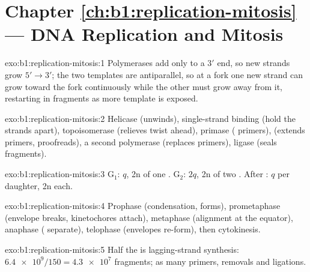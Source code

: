 \section*{Chapter \ref{ch:b1:replication-mitosis} --- DNA Replication and Mitosis}

\begin{solution}{exo:b1:replication-mitosis:1}
Polymerases add  only to a $3'$ end, so new strands grow
$5' \to 3'$; the two templates are antiparallel, so at a fork one new
strand can grow toward the fork continuously while the other must
grow away from it, restarting in fragments as more template is
exposed.
\end{solution}

\begin{solution}{exo:b1:replication-mitosis:2}
Helicase (unwinds), single-strand binding  (hold the strands
apart), topoisomerase (relieves twist ahead), primase ( primers),
 (extends primers, proofreads), a second polymerase
(replaces primers), ligase (seals fragments).
\end{solution}

\begin{solution}{exo:b1:replication-mitosis:3}
G$_1$: $q$, 2n  of one . G$_2$: $2q$, 2n
 of two . After : $q$ per daughter, 2n
 each.
\end{solution}

\begin{solution}{exo:b1:replication-mitosis:4}
Prophase (condensation,  forms), prometaphase (envelope breaks,
kinetochores attach), metaphase (alignment at the equator), anaphase
( separate), telophase (envelopes re-form), then
cytokinesis.
\end{solution}

\begin{solution}{exo:b1:replication-mitosis:5}
Half the  is lagging-strand synthesis: $\num{6.4e9}/150 =
\num{4.3e7}$ fragments; as many primers, removals and ligations.
\end{solution}

